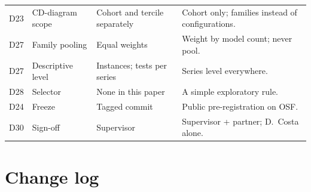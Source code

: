\documentclass[11pt,a4paper]{article}
\begin{document}
{\begin{longtable}{@{}p{0.8cm} p{3.2cm} p{4.0cm} p{7.0cm}@{}}
D23 & CD-diagram scope & Cohort and tercile separately & Cohort only; families instead of configurations. \\
D27 & Family pooling & Equal weights & Weight by model count; never pool. \\
D27 & Descriptive level & Instances; tests per series & Series level everywhere. \\
D28 & Selector & None in this paper & A simple exploratory rule. \\
D24 & Freeze & Tagged commit & Public pre-registration on OSF. \\
D30 & Sign-off & Supervisor & Supervisor + partner; D.\ Costa alone. \\
\end{longtable}
}

\section{Change log}\label{app:changelog}
\end{document}

